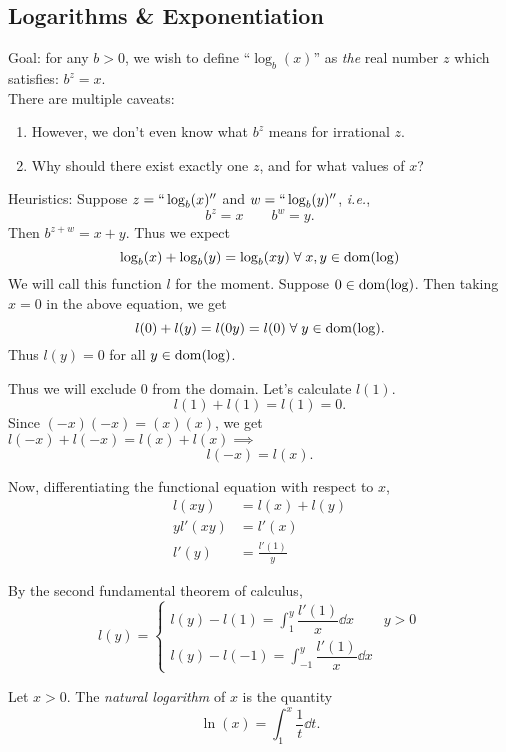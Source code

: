 
\subsection{Logarithms \& Exponentiation}
Goal: for any $b > 0$, we wish to define ``$\log_{b}(x)$'' as \emph{the} real number $z$ which satisfies: $b^z = x$. \\
There are multiple caveats:

\begin{enumerate}[label=(\alph*)]
    \item However, we don't even know what $b^{z}$ means for irrational $z$.
    \item Why should there exist exactly one $z$, and for what values of $x$?
\end{enumerate}

Heuristics: Suppose $z = ``\log_{b}(x)''$ and $w = ``\log_{b}(y)''$, \textit{i.e.}, \[
    b^{z} = x \qquad b^{w} = y.
\] Then $b^{z + w} = x + y$. Thus we expect \begin{equation}
    \log_{b}(x) + \log_{b}(y) = \log_{b}(xy) \;\forall\; x, y \in \operatorname{dom}(\log)
\end{equation}
We will call this function $l$ for the moment.
Suppose $0 \in \operatorname{dom}(\log)$. Then taking $x = 0$ in the above equation, we get \[
    l(0) + l(y) = l(0y) = l(0) \;\forall\; y \in \operatorname{dom}(\log).
\] Thus $l(y) = 0$ for all $y \in \operatorname{dom}(\log)$.

Thus we will exclude $0$ from the domain. Let's calculate $l(1)$. \[
    l(1) + l(1) = l(1) = 0.
\] Since $(-x)(-x) = (x)(x)$, we get $l(-x) + l(-x) = l(x) + l(x) \implies$ \[
    l(-x) = l(x).
\]

Now, differentiating the functional equation with respect to $x$,
\begin{align*}
    l(xy) &= l(x) + l(y) \\
    yl'(xy) &= l'(x) \\
    l'(y) &= \frac{l'(1)}{y}
\end{align*}

By the second fundamental theorem of calculus, \[
    l(y) = \begin{cases}
        l(y) - l(1) = \int_{1}^{y} \dfrac{l'(1)}{x} \dd x & y > 0 \\
        l(y) - l(-1) = \int_{-1}^{y} \dfrac{l'(1)}{x} \dd x
    \end{cases}
\]

\begin{defn} \label{defn:ln}
    Let $x > 0$. The \emph{natural logarithm} of $x$ is the quantity \[
        \ln(x) = \int_{1}^{x} \frac{1}{t} \dd t.
    \]
\end{defn}

